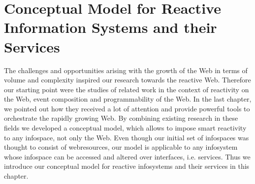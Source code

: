 

\chapter{Conceptual Model for Reactive Information Systems and their Services}
The challenges and opportunities arising with the growth of the Web in terms of volume and complexity inspired our research towards the reactive Web.
Therefore our starting point were the studies of related work in the context of reactivity on the Web, event composition and programmability of the Web.
In the last chapter, we pointed out how they received a lot of attention and provide powerful tools to orchestrate the rapidly growing Web.
By combining existing research in these fields we developed a conceptual model, which allows to impose smart reactivity to any \textrm{\gls{infospace}}, not only the Web.
Even though our initial set of \textrm{\glspl{infospace}} was thought to consist of \textrm{\glspl{webresource}}, our model is applicable to any \textrm{\gls{infosystem}} whose \textrm{\gls{infospace}} can be accessed and altered over interfaces, i.e. services.
Thus we introduce our conceptual model for reactive \textrm{\glspl{infosystem}} and their services in this chapter.

